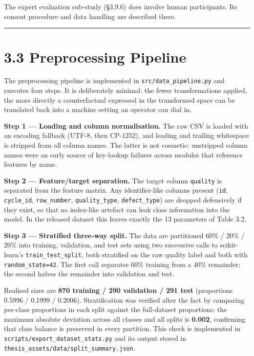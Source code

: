 The expert evaluation sub-study (§3.9.6) does involve human participants. Its consent procedure and data handling are described there.

\begin{center}\rule{0.5\linewidth}{0.5pt}\end{center}

\hypertarget{preprocessing-pipeline}{%
\section{3.3 Preprocessing Pipeline}\label{preprocessing-pipeline}}

The preprocessing pipeline is implemented in \texttt{src/data\_pipeline.py} and executes four steps. It is deliberately minimal: the fewer transformations applied, the more directly a counterfactual expressed in the transformed space can be translated back into a machine setting an operator can dial in.

\textbf{Step 1 --- Loading and column normalisation.} The raw CSV is loaded with an encoding fallback (UTF-8, then CP-1252), and leading and trailing whitespace is stripped from all column names. The latter is not cosmetic: unstripped column names were an early source of key-lookup failures across modules that reference features by name.

\textbf{Step 2 --- Feature/target separation.} The target column \texttt{quality} is separated from the feature matrix. Any identifier-like columns present (\texttt{id}, \texttt{cycle\_id}, \texttt{row\_number}, \texttt{quality\_type}, \texttt{defect\_type}) are dropped defensively if they exist, so that no index-like artefact can leak class information into the model. In the released dataset this leaves exactly the 13 parameters of Table 3.2.

\textbf{Step 3 --- Stratified three-way split.} The data are partitioned 60\% / 20\% / 20\% into training, validation, and test sets using two successive calls to scikit-learn's \texttt{train\_test\_split}, both stratified on the raw quality label and both with \texttt{random\_state=42}. The first call separates 60\% training from a 40\% remainder; the second halves the remainder into validation and test.

Realised sizes are \textbf{870 training / 290 validation / 291 test} (proportions 0.5996 / 0.1999 / 0.2006). Stratification was verified after the fact by comparing per-class proportions in each split against the full-dataset proportions: the maximum absolute deviation across all classes and all splits is \textbf{0.002}, confirming that class balance is preserved in every partition. This check is implemented in \texttt{scripts/export\_dataset\_stats.py} and its output stored in \texttt{thesis\_assets/data/split\_summary.json}.

